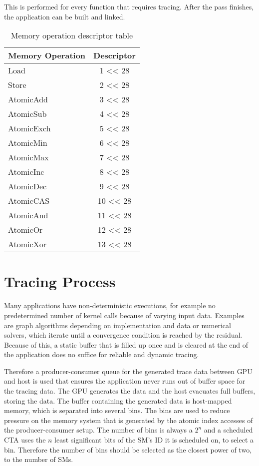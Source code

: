 This is performed for every function that requires tracing. After the pass finishes, the application can be built
and linked.
\begin{table}[t]
	\centering
\begin{tabular}{|l|c|}
	\hline 
	Memory Operation & Descriptor \\ 
	\hline 
	Load & 1 << 28 \\ 
	\hline 
	Store & 2 << 28 \\ 
	\hline 
	AtomicAdd & 3 << 28 \\ 
	\hline 
	AtomicSub & 4 << 28 \\ 
	\hline 
	AtomicExch & 5 << 28 \\ 
	\hline 
	AtomicMin & 6 << 28 \\ 
	\hline 
	AtomicMax & 7 << 28 \\ 
	\hline 
	AtomicInc & 8 << 28 \\ 
	\hline 
	AtomicDec & 9 << 28 \\ 
	\hline 
	AtomicCAS & 10 << 28 \\ 
	\hline 
	AtomicAnd & 11 << 28 \\ 
	\hline 
	AtomicOr & 12 << 28 \\ 
	\hline 
	AtomicXor & 13 << 28 \\ 
	\hline 
\end{tabular} 
 \label{TypeTab}
 \caption{Memory operation descriptor table}
\end{table}


\section{Tracing Process}\label{sec:prodcons}
	Many applications have non-deterministic executions, for example no predetermined number of kernel calls because of varying input data. Examples are graph algorithms depending on implementation and data or numerical solvers, which iterate until a
	convergence condition is reached by the residual. Because of this, a static buffer that is filled up once and is cleared at the end of the application does no suffice for reliable and dynamic tracing.
	
	Therefore a producer-consumer queue for the generated trace data between GPU and host is used that ensures the application never runs out of buffer space for the tracing data. The GPU generates the data and the host evacuates full buffers, storing the data.
	The buffer containing the generated data is host-mapped memory, which is separated into several bins. The bins are used to reduce
	pressure on the memory system that is generated by the atomic index accesses of the producer-consumer setup. The number of bins 
	is always a $2^n$ and a scheduled CTA uses the  $n$ least significant bits of the SM's ID it is scheduled on, to select a bin. Therefore the number of bins should be selected as the closest power of two, to the number of SMs.

